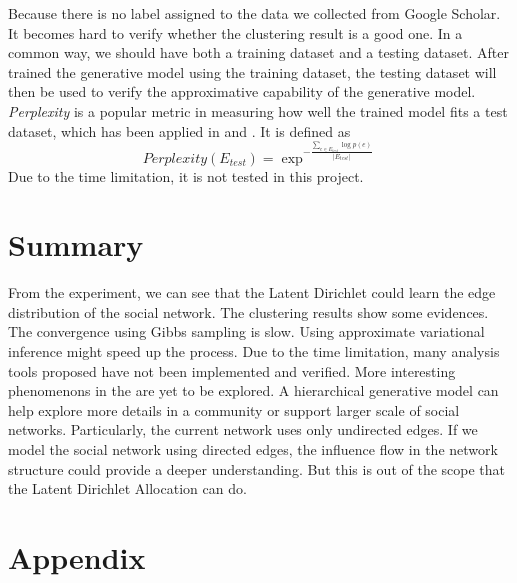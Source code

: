 \documentclass[letterpaper]{article}
\begin{document}
Because there is no label assigned to the data we collected from Google Scholar.
It becomes hard to verify whether the clustering result is a good one.
In a common way, we should have both a training dataset and a testing dataset.
After trained the generative model using the training dataset, the testing dataset will then be used to verify the approximative capability of the generative model.
\emph{Perplexity} is a popular metric in measuring how well the trained model fits a test dataset, which has been applied in \cite{Cha:2012:SAU:2348283.2348360} and \cite{4258697}.
It is defined as 
\begin{equation}
Perplexity( E_{test} ) = \exp^{- \frac{ \sum_{e \in E_{test}} \log p(e) }{ | E_{test} | } }
\end{equation}
Due to the time limitation, it is not tested in this project.

\section{Summary}

From the experiment, we can see that the Latent Dirichlet could learn the edge distribution of the social network.
The clustering results show some evidences.
The convergence using Gibbs sampling is slow.
Using approximate variational inference might speed up the process.
Due to the time limitation, many analysis tools proposed have not been implemented and verified.
More interesting phenomenons in the  are yet to be explored.
A hierarchical generative model can help explore more details in a community or support larger scale of social networks.
Particularly, the current network uses only undirected edges.
If we model the social network using directed edges, the influence flow in the network structure could provide a deeper understanding.
But this is out of the scope that the Latent Dirichlet Allocation can do.
\section{Appendix}
\label{sec:appendix}
\end{document}
